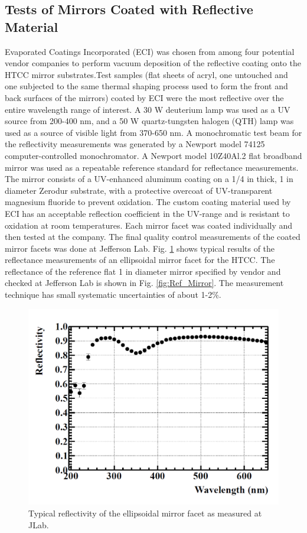 \subsection{Tests of Mirrors Coated with Reflective Material}
Evaporated Coatings Incorporated (ECI) was chosen from among four potential vendor companies to perform vacuum deposition of the reflective coating onto the HTCC mirror substrates.Test samples (flat sheets of acryl, one untouched and one subjected to the same thermal shaping process used to form the front and back surfaces of the mirrors) coated by ECI were the most reflective over the entire wavelength range of interest. A 30 W deuterium lamp was used as a UV source from 200-400 nm, and a 50 W quartz-tungsten halogen (QTH) lamp was used as a source of visible light from 370-650 nm. A monochromatic test beam for the reflectivity measurements was generated by a Newport model 74125 computer-controlled monochromator. A Newport model 10Z40Al.2 flat broadband mirror was used as a repeatable reference standard for reflectance measurements. The mirror consists of a UV-enhanced aluminum coating on a 1/4 in thick, 1 in diameter Zerodur substrate, with a protective overcoat of UV-transparent magnesium fluoride to prevent oxidation.
The custom coating material used by ECI has an acceptable reflection coefficient in the UV-range and is resistant to oxidation at room temperatures. Each mirror facet was coated individually and then tested at the company. The final quality control measurements of the coated mirror facets was done at Jefferson Lab. Fig. \ref{fig:JLab_Mirror}  shows typical results of the reflectance  measurements of an ellipsoidal mirror facet for the HTCC. The reflectance of the reference flat 1 in diameter mirror specified by vendor and checked at Jefferson Lab is shown in Fig. \ref{fig:Ref_Mirror}. The measurement technique has small systematic uncertainties of about 1-2\%.

\begin{figure}[ht]
    \centering
    \includegraphics[width=1.0\linewidth]{images/JLab_Mirror}
    \caption{Typical reflectivity of the ellipsoidal mirror facet as measured at JLab.}
    \label{fig:JLab_Mirror}
\end{figure}


